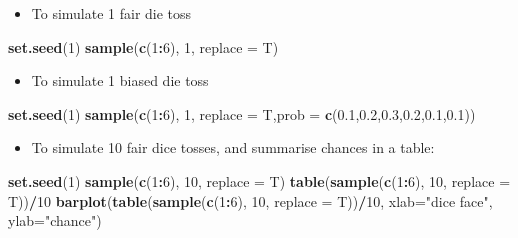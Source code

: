 \documentclass[]{article}
\newenvironment{Shaded}{\begin{snugshade}}{\end{snugshade}}
\newcommand{\DataTypeTok}[1]{\textcolor[rgb]{0.13,0.29,0.53}{#1}}
\newcommand{\DecValTok}[1]{\textcolor[rgb]{0.00,0.00,0.81}{#1}}
\newcommand{\FloatTok}[1]{\textcolor[rgb]{0.00,0.00,0.81}{#1}}
\newcommand{\KeywordTok}[1]{\textcolor[rgb]{0.13,0.29,0.53}{\textbf{#1}}}
\newcommand{\NormalTok}[1]{#1}
\newcommand{\OperatorTok}[1]{\textcolor[rgb]{0.81,0.36,0.00}{\textbf{#1}}}
\newcommand{\StringTok}[1]{\textcolor[rgb]{0.31,0.60,0.02}{#1}}
\providecommand{\tightlist}{%
  \setlength{\itemsep}{0pt}\setlength{\parskip}{0pt}}
\begin{document}
\begin{itemize}
\tightlist
\item
  To simulate 1 fair die toss
\end{itemize}

\begin{Shaded}
\begin{Highlighting}[]
\KeywordTok{set.seed}\NormalTok{(}\DecValTok{1}\NormalTok{)}
\KeywordTok{sample}\NormalTok{(}\KeywordTok{c}\NormalTok{(}\DecValTok{1}\OperatorTok{:}\DecValTok{6}\NormalTok{), }\DecValTok{1}\NormalTok{, }\DataTypeTok{replace =}\NormalTok{ T)}
\end{Highlighting}
\end{Shaded}

\begin{itemize}
\tightlist
\item
  To simulate 1 biased die toss
\end{itemize}

\begin{Shaded}
\begin{Highlighting}[]
\KeywordTok{set.seed}\NormalTok{(}\DecValTok{1}\NormalTok{)}
\KeywordTok{sample}\NormalTok{(}\KeywordTok{c}\NormalTok{(}\DecValTok{1}\OperatorTok{:}\DecValTok{6}\NormalTok{), }\DecValTok{1}\NormalTok{, }\DataTypeTok{replace =}\NormalTok{ T,}\DataTypeTok{prob =} \KeywordTok{c}\NormalTok{(}\FloatTok{0.1}\NormalTok{,}\FloatTok{0.2}\NormalTok{,}\FloatTok{0.3}\NormalTok{,}\FloatTok{0.2}\NormalTok{,}\FloatTok{0.1}\NormalTok{,}\FloatTok{0.1}\NormalTok{))}
\end{Highlighting}
\end{Shaded}

\begin{itemize}
\tightlist
\item
  To simulate 10 fair dice tosses, and summarise chances in a table:
\end{itemize}

\begin{Shaded}
\begin{Highlighting}[]
\KeywordTok{set.seed}\NormalTok{(}\DecValTok{1}\NormalTok{)}
\KeywordTok{sample}\NormalTok{(}\KeywordTok{c}\NormalTok{(}\DecValTok{1}\OperatorTok{:}\DecValTok{6}\NormalTok{), }\DecValTok{10}\NormalTok{, }\DataTypeTok{replace =}\NormalTok{ T)}
\KeywordTok{table}\NormalTok{(}\KeywordTok{sample}\NormalTok{(}\KeywordTok{c}\NormalTok{(}\DecValTok{1}\OperatorTok{:}\DecValTok{6}\NormalTok{), }\DecValTok{10}\NormalTok{, }\DataTypeTok{replace =}\NormalTok{ T))}\OperatorTok{/}\DecValTok{10}
\KeywordTok{barplot}\NormalTok{(}\KeywordTok{table}\NormalTok{(}\KeywordTok{sample}\NormalTok{(}\KeywordTok{c}\NormalTok{(}\DecValTok{1}\OperatorTok{:}\DecValTok{6}\NormalTok{), }\DecValTok{10}\NormalTok{, }\DataTypeTok{replace =}\NormalTok{ T))}\OperatorTok{/}\DecValTok{10}\NormalTok{, }\DataTypeTok{xlab=}\StringTok{"dice face"}\NormalTok{, }\DataTypeTok{ylab=}\StringTok{"chance"}\NormalTok{)}
\end{Highlighting}
\end{Shaded}
\end{document}
